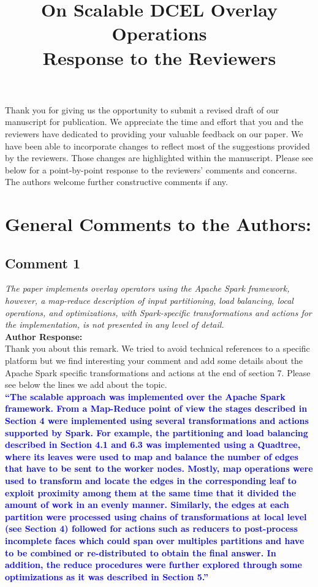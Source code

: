 \documentclass[10pt]{article}
\title{On Scalable DCEL Overlay Operations\\{\large Response to the Reviewers}}
\author{}
\begin{document}
\maketitle
Thank you for giving us the opportunity to submit a revised draft of our manuscript for publication.  We appreciate the time and effort that you and the reviewers have dedicated to providing your valuable feedback on our paper.  We have been able to incorporate changes to reflect most of the suggestions provided by the reviewers. Those changes are highlighted within the manuscript.  Please see below for a point-by-point response to the reviewers’ comments and concerns. The authors welcome further constructive comments if any.

\section*{General Comments to the Authors:}
\subsection*{Comment 1}
\textit{
The paper implements overlay operators using the Apache Spark framework, however, a map-reduce description of input partitioning, load balancing, local operations, and optimizations, with Spark-specific transformations and actions for the implementation, is not presented in any level of detail.
} \\

\textbf{Author Response:}\\

Thank you about this remark.  We tried to avoid technical references to a specific platform but we find interesting your comment and add some details about the Apache Spark specific transformations and actions at the end of section 7.  Please see below the lines we add about the topic.\\

\textbf{\textcolor{blue}{
``The scalable approach was implemented over the Apache Spark framework.  From a Map-Reduce point of view the stages described in Section 4 were implemented using several transformations and actions supported by Spark.  For example, the partitioning and load balancing described in Section 4.1 and 6.3 was implemented using a Quadtree, where its leaves were used to map and balance the number of edges that have to be sent to the worker nodes.  Mostly, map operations were used to transform and locate the edges in the corresponding leaf to exploit proximity among them at the same time that it divided the amount of work in an evenly manner.
Similarly, the edges at each partition were processed using chains of transformations at local level (see Section 4) followed for actions such as reducers to post-process incomplete faces which could span over multiples partitions and have to be combined or re-distributed to obtain the final answer.  In addition, the reduce procedures were further explored through some optimizations as it was described in Section 5.''
}}
\end{document}
